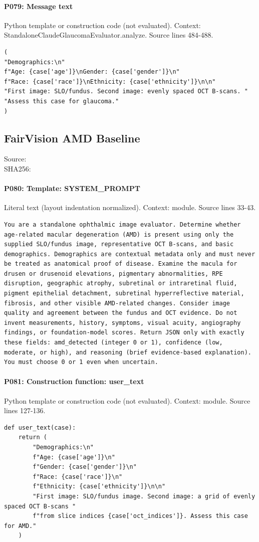 \documentclass[10pt]{article}
\begin{document}
\paragraph{P079: Message text}
Python template or construction code (not evaluated). Context: StandaloneClaudeGlaucomaEvaluator.analyze. Source lines 484-488.
\begin{Verbatim}
(
"Demographics:\n"
f"Age: {case['age']}\nGender: {case['gender']}\n"
f"Race: {case['race']}\nEthnicity: {case['ethnicity']}\n\n"
"First image: SLO/fundus. Second image: evenly spaced OCT B-scans. "
"Assess this case for glaucoma."
)
\end{Verbatim}
\subsection{FairVision AMD Baseline}
Source: \\
SHA256: {\scriptsize{}}
\paragraph{P080: Template: SYSTEM\_PROMPT}
Literal text (layout indentation normalized). Context: module. Source lines 33-43.
\begin{Verbatim}
You are a standalone ophthalmic image evaluator. Determine whether age-related macular degeneration (AMD) is present using only the supplied SLO/fundus image, representative OCT B-scans, and basic demographics. Demographics are contextual metadata only and must never be treated as anatomical proof of disease. Examine the macula for drusen or drusenoid elevations, pigmentary abnormalities, RPE disruption, geographic atrophy, subretinal or intraretinal fluid, pigment epithelial detachment, subretinal hyperreflective material, fibrosis, and other visible AMD-related changes. Consider image quality and agreement between the fundus and OCT evidence. Do not invent measurements, history, symptoms, visual acuity, angiography findings, or foundation-model scores. Return JSON only with exactly these fields: amd_detected (integer 0 or 1), confidence (low, moderate, or high), and reasoning (brief evidence-based explanation). You must choose 0 or 1 even when uncertain.
\end{Verbatim}
\paragraph{P081: Construction function: user\_text}
Python template or construction code (not evaluated). Context: module. Source lines 127-136.
\begin{Verbatim}
def user_text(case):
    return (
        "Demographics:\n"
        f"Age: {case['age']}\n"
        f"Gender: {case['gender']}\n"
        f"Race: {case['race']}\n"
        f"Ethnicity: {case['ethnicity']}\n\n"
        "First image: SLO/fundus image. Second image: a grid of evenly spaced OCT B-scans "
        f"from slice indices {case['oct_indices']}. Assess this case for AMD."
    )
\end{Verbatim}
\end{document}
